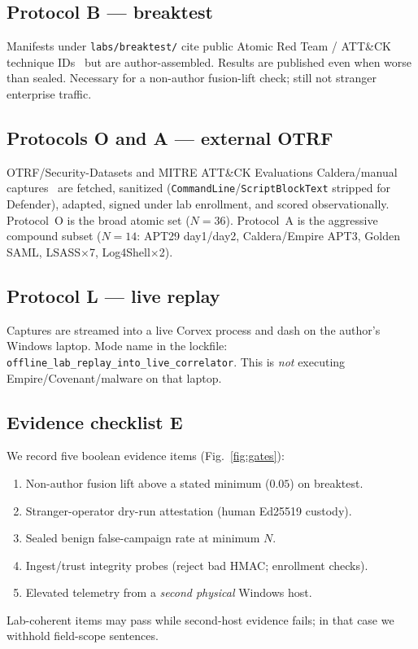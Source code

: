 \documentclass[conference,compsoc]{IEEEtran}
\begin{document}
\subsection{Protocol B --- breaktest}
Manifests under \texttt{labs/breaktest/} cite public Atomic Red Team / ATT\&CK
technique IDs~\cite{atomic_red_team} but are author-assembled.
Results are published even when worse than sealed.
Necessary for a non-author fusion-lift check; still not stranger enterprise
traffic.

\subsection{Protocols O and A --- external OTRF}
OTRF/Security-Datasets and MITRE ATT\&CK Evaluations Caldera/manual
captures~\cite{otrf_mordor,attack_evals,caldera} are fetched, sanitized
(\texttt{CommandLine}/\texttt{ScriptBlockText} stripped for Defender), adapted,
signed under lab enrollment, and scored observationally.
Protocol~O is the broad atomic set ($N{=}36$).
Protocol~A is the aggressive compound subset ($N{=}14$: APT29 day1/day2,
Caldera/Empire APT3, Golden SAML, LSASS$\times$7, Log4Shell$\times$2).

\subsection{Protocol L --- live replay}
Captures are streamed into a live Corvex process and dash on the author's
Windows laptop.
Mode name in the lockfile:
\texttt{offline\_lab\_replay\_into\_live\_correlator}.
This is \emph{not} executing Empire/Covenant/malware on that laptop.

\subsection{Evidence checklist E}
We record five boolean evidence items (Fig.~\ref{fig:gates}):
\begin{enumerate}
\item Non-author fusion lift above a stated minimum ($0.05$) on breaktest.
\item Stranger-operator dry-run attestation (human Ed25519 custody).
\item Sealed benign false-campaign rate at minimum $N$.
\item Ingest/trust integrity probes (reject bad HMAC; enrollment checks).
\item Elevated telemetry from a \emph{second physical} Windows host.
\end{enumerate}
Lab-coherent items may pass while second-host evidence fails; in that case we
withhold field-scope sentences.
\end{document}
